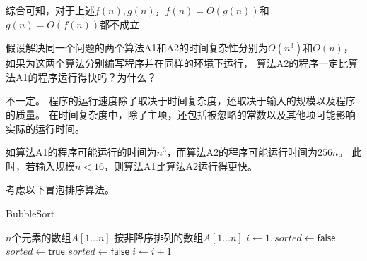 \begin{questions}
\begin{solution}
        综合可知，对于上述$f(n),g(n)$，$f(n)=O(g(n))$和$g(n)=O(f(n))$都不成立
    \end{solution}


    \question 假设解决同一个问题的两个算法A1和A2的时间复杂性分别为$O(n^3)$和$O(n)$，
    如果为这两个算法分别编写程序并在同样的环境下运行，
    算法A2的程序一定比算法A1的程序运行得快吗？为什么？

    \begin{solution}
        不一定。
        程序的运行速度除了取决于时间复杂度，还取决于输入的规模以及程序的质量。
        在时间复杂度中，除了主项，还包括被忽略的常数以及其他项可能影响实际的运行时间。

        如算法A1的程序可能运行的时间为$n^3$，而算法A2的程序可能运行时间为$256n$。
        此时，若输入规模$n < 16$，则算法A1比算法A2运行得更快。
    \end{solution}


    \question 考虑以下冒泡排序算法。
    \begin{algorithm}
        \caption{BubbleSort}
        \begin{algorithmic}[1]
            \Require $n$个元素的数组$A[1 \dots n]$
            \Ensure 按非降序排列的数组$A[1 \dots n]$
            \State $i \gets 1, sorted \gets \mathsf{false}$
            \State $sorted \gets \mathsf{true}$
            \State {}
            \State $sorted \gets \mathsf{false}$
            \EndIf
            \EndFor
            \State  $i \gets i+1$
            \EndWhile
        \end{algorithmic}
    \end{algorithm}
\end{questions}
